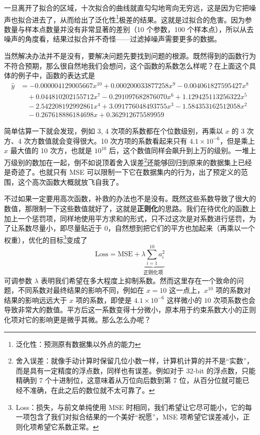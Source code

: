 \documentclass[UTF8, 12pt]{article}
\begin{document}
一旦离开了拟合的区域，十次拟合的曲线就直勾勾地弯向无穷远，这是因为它把噪声也拟合进去了，从而给出了泛化性\footnote{泛化性：预测原有数据集以外点的能力}极差的结果。这就是过拟合的危害。因为参数量与样本点数量并没有非常显著的差别（10 个参数，100 个样本点），所以从去噪声的角度看，结果过拟合并不奇怪——过滤掉噪声需要更多的数据。

当然解决办法并不是没有，要解决问题先要找到问题的根源。既然得到的函数行为不符合预期，那么很自然地我们会想问，这个函数的系数怎么样呢？在上面这个具体的例子中，函数的表达式是
\[
    \begin{aligned}
        \hat y & = -0.000004129005667 x^{10} + 0.000200033877258 x^9 - 0.004061827595427 x^8   \\
               & \quad + 0.044810202155712 x^7 - 0.291097682876070 x^6 + 1.129425113256322 x^5 \\
               & \quad - 2.542208192992861 x^4 + 3.091776048493755 x^3 - 1.584353162512058 x^2 \\
               & \quad - 0.267618886184698 x + 0.362912675589959
    \end{aligned}
\]

简单估算一下就会发现，例如 3, 4 次项的系数都在个位数级别，再乘以 $x$ 的 3 次方、4 次方数值就会变得很大。10 次方项的系数看起来只有 $4.1\times 10^{-6}$，但是乘上 $x$ 最大值的 10 次方，也就是 $10^{10}$ 后，这个数值同样会飙升到上万的级别。一堆上万级别的数加在一起，倒不如说顶着舍入误差\footnote{舍入误差：就像手动计算时保留几位小数一样，计算机计算的并不是“实数”，而是具有一定精度的浮点数，同样也有误差。例如对于 32-bit 的浮点数，只能精确到 7 个十进制位，这意味着从万位向后数到第 7 位，从百分位就可能已经不准确，在此之后的数位就不太可靠了。}还能够回归到原来的数据集上已经是奇迹了。也就只有 MSE 可以限制一下它在数据集内的行为，出了预定义的范围，这个高次函数大概就放飞自我了。

不过如果一定要用高次函数，补救的办法也不是没有。既然这些系数导致了很大的数值，那限制一下这些数值就好了，这就是\textbf{正则化}的思路。我们在待优化的函数上加上一个惩罚项，同样地使用平方求和的形式，只不过这次是对系数进行惩罚，为了让系数尽量小，即尽量贴近于 $0$，自然想到把它们的平方也加起来（再乘以一个权重），优化的目标\footnote{Loss：损失，与前文单纯使用 MSE 时相同，我们希望让它尽可能小，它的每一项包含了我们对拟合结果的一个美好“祝愿”，MSE 项希望它误差减小，正则化项希望它系数正常。}变成了
\[
    \text{Loss} = \text{MSE} + \underset{\text{正则化项}}{\underbrace{\lambda \sum_{i=1}^{10} a_i^2}}
\]
可调参数 $\lambda$ 表明我们希望在多大程度上抑制系数。然而这里存在一个致命的问题，不同系数对最终结果的影响不同，例如在 $x=10$ 这一点上，$x^{10}$ 项的系数对结果的影响远远大于 $x$ 项的系数，即使是 $4.1\times 10^{-6}$ 这样微小的 $10$ 次项系数也会导致非常大的数值。平方后这一系数变得十分微小，原本用于约束系数大小的正则化项对它的影响更是微乎其微。那么怎么办呢？
\end{document}
